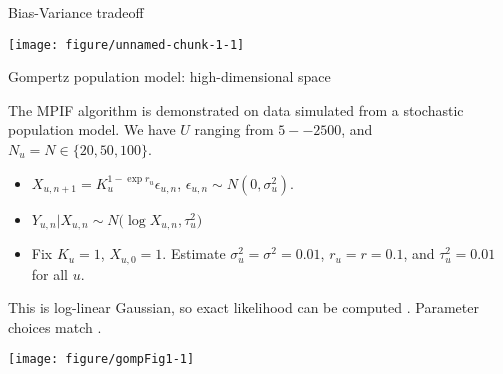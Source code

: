 \documentclass[aspectratio=169]{beamer}\usepackage[]{graphicx}\usepackage[]{xcolor}
\makeatletter
\def\maxwidth{ %
  \ifdim\Gin@nat@width>\linewidth
    \linewidth
  \else
    \Gin@nat@width
  \fi
}
\newenvironment{knitrout}{}{} %
\makeatother
\begin{document}
\begin{frame}{Bias-Variance tradeoff}
  
\begin{knitrout}
\color{fgcolor}

{\centering \texttt{[image: figure/unnamed-chunk-1-1]} 

}


\end{knitrout}
  
\end{frame}

\begin{frame}{Gompertz population model: high-dimensional space}

The MPIF algorithm is demonstrated on data simulated from a stochastic population model. We have $U$ ranging from $5--2500$, and $N_u = N \in \{20, 50, 100\}$.
\begin{itemize}
  \item $X_{u, n+1} = K^{1- \exp{r_u}}_u \epsilon_{u, n}$, $\epsilon_{u, n} \sim N(0, \sigma^2_u)$. 
  \item $Y_{u, n} | X_{u, n} \sim N\big(\log X_{u, n}, \tau^2_u\big)$
  \item Fix $K_u = 1$, $X_{u, 0} = 1$. Estimate $\sigma_u^2 = \sigma^2 = 0.01$, $r_u = r = 0.1$, and $\tau_u^2 = 0.01$ for all $u$.  
\end{itemize}

This is log-linear Gaussian, so exact likelihood can be computed \citep{kalman60}. Parameter choices match \citet{breto20}. 

\end{frame}

\begin{frame}


\begin{knitrout}
\color{fgcolor}

{\centering \texttt{[image: figure/gompFig1-1]} 

}


\end{knitrout}
\end{frame}
\end{document}
